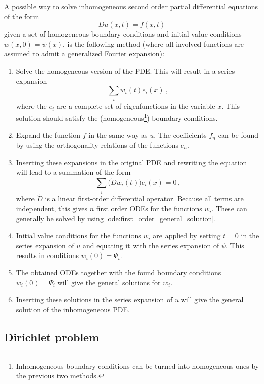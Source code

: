     \begin{method}
        A possible way to solve inhomogeneous second order partial differential equations of the form \[Du(x,t) = f(x,t)\] given a set of homogeneous boundary conditions and initial value conditions $w(x,0)=\psi(x)$, is the following method (where all involved functions are assumed to admit a generalized Fourier expansion):
        \begin{enumerate}
            \item Solve the homogeneous version of the PDE. This will result in a series expansion \[\sum_iw_i(t)e_i(x)\,,\] where the $e_i$ are a complete set of eigenfunctions in the variable $x$. This solution should satisfy the (homogeneous\footnote{Inhomogeneous boundary conditions can be turned into homogeneous ones by the previous two methods.}) boundary conditions.
            \item Expand the function $f$ in the same way as $u$. The coefficients $f_n$ can be found by using the orthogonality relations of the functions $e_n$.
            \item Inserting these expansions in the original PDE and rewriting the equation will lead to a summation of the form
            \[\sum_i\big(\widetilde{D}w_i(t)\big)e_i(x) = 0\,,\] where $\widetilde{D}$ is a linear first-order differential operator. Because all terms are independent, this gives $n$ first order ODEs for the functions $w_i$. These can generally be solved by using \cref{ode:first_order_general_solution}.
            \item Initial value conditions for the functions $w_i$ are applied by setting $t=0$ in the series expansion of $u$ and equating it with the series expansion of $\psi$. This results in conditions $w_i(0) = \Psi_i$.
            \item The obtained ODEs together with the found boundary conditions $w_i(0) = \Psi_i$ will give the general solutions for $w_i$.
            \item Inserting these solutions in the series expansion of $u$ will give the general solution of the inhomogeneous PDE.
        \end{enumerate}
    \end{method}

\subsection{Dirichlet problem}

